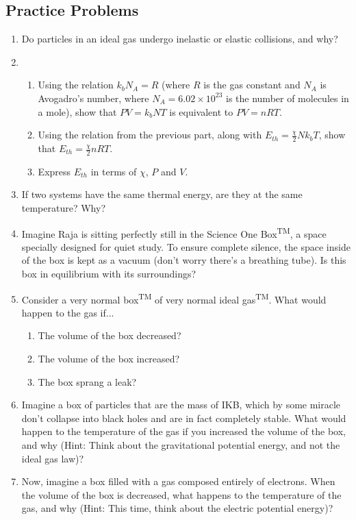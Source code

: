 \subsection{Practice Problems}
\begin{enumerate}
    \item Do particles in an ideal gas undergo inelastic or elastic collisions, and why? 
    \item \begin{enumerate}
        \item Using the relation $k_{b}N_A=R$ (where $R$ is the gas constant and $N_A$ is Avogadro's number, where $N_A = 6.02 \times 10^{23}$ is the number of molecules in a mole), show that $PV={k_{b}}NT$ is equivalent to $PV=nRT$.
        \item Using the relation from the previous part, along with $E_{th} = \frac{\chi}{2}Nk_bT$, show that $E_{th}=\frac{\chi}{2}nRT$.
        \item Express $E_{th}$ in terms of $\chi$, $P$ and $V$.
    \end{enumerate}
    \item If two systems have the same thermal energy, are they at the same temperature? Why?
    \item Imagine Raja is sitting perfectly still in the Science One Box\textsuperscript{TM}, a space specially designed for quiet study. To ensure complete silence, the space inside of the box is kept as a vacuum (don't worry there's a breathing tube). Is this box in equilibrium with its surroundings?
    \item Consider a very normal box\textsuperscript{TM} of very normal ideal gas\textsuperscript{TM}. What would happen to the gas if...
    \begin{enumerate}
        \item The volume of the box decreased?
        \item The volume of the box increased?
        \item The box sprang a leak?
    \end{enumerate}
    \item Imagine a box of particles that are the mass of IKB, which by some miracle don't collapse into black holes and are in fact completely stable. What would happen to the temperature of the gas if you increased the volume of the box, and why (Hint: Think about the gravitational potential energy, and not the ideal gas law)?
    \item Now, imagine a box filled with a gas composed entirely of electrons. When the volume of the box is decreased, what happens to the temperature of the gas, and why (Hint: This time, think about the electric potential energy)?

\end{enumerate}
